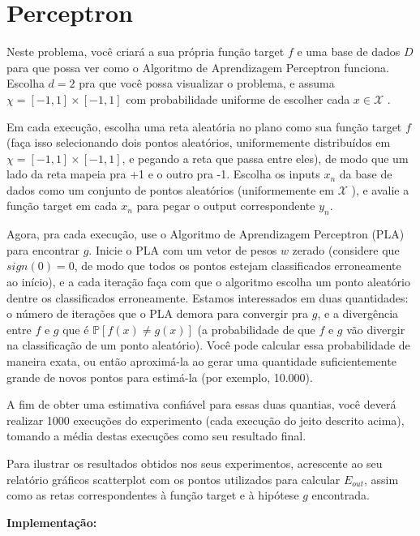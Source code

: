 \section{Perceptron}

Neste problema, você criará a sua própria função target $f$ e uma base de dados $D$ para que possa ver como o
Algoritmo de Aprendizagem Perceptron funciona. Escolha $d = 2$ pra que você possa visualizar o problema,
e assuma $\chi = [-1, 1] \times [-1, 1]$ com probabilidade uniforme de escolher cada $x \in \mathcal{X}$ .

Em cada execução, escolha uma reta aleatória no plano como sua função target $f$ (faça isso selecionando dois pontos aleatórios, uniformemente distribuídos em  $\chi = [-1, 1] \times [-1, 1]$, e pegando a reta que passa entre eles), de modo que um lado da reta mapeia pra +1 e o outro pra -1. Escolha os inputs $x_n$ da base de dados como um conjunto de pontos aleatórios (uniformemente em $ \mathcal{X}$ ), e avalie a função target em cada $x_n$ para pegar o output correspondente $y_n$.

Agora, pra cada execução, use o Algoritmo de Aprendizagem Perceptron (PLA) para encontrar $g$. Inicie o PLA com um vetor de pesos $w$ zerado (considere que $sign(0) = 0$, de modo que todos os pontos estejam classificados erroneamente ao início), e a cada iteração faça com que o algoritmo escolha um ponto aleatório dentre os classificados erroneamente. Estamos interessados em duas quantidades: o número de iterações que o PLA demora para convergir pra $g$, e a divergência entre $f$ e $g$ que é $\mathbb{P}[f (x) \neq g(x)]$ (a probabilidade de que $f$ e $g$ vão divergir na classificação de um ponto aleatório). Você pode calcular essa probabilidade de maneira exata, ou então aproximá-la ao gerar uma quantidade suficientemente grande de novos pontos para estimá-la (por exemplo, 10.000).

A fim de obter uma estimativa confiável para essas duas quantias, você deverá realizar 1000 execuções do experimento (cada execução do jeito descrito acima), tomando a média destas execuções como seu resultado
final.

Para ilustrar os resultados obtidos nos seus experimentos, acrescente ao seu relatório gráficos scatterplot
com os pontos utilizados para calcular $E_{out}$, assim como as retas correspondentes à função target e à hipótese $g$ encontrada.
\newline \par
\textbf{Implementação:}

